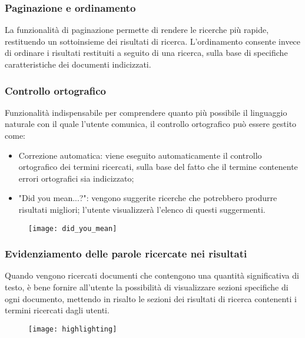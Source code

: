 			\subsubsection{Paginazione e ordinamento}
			La funzionalità di paginazione permette di rendere le ricerche più rapide, restituendo un sottoinsieme dei risultati di ricerca.
			L'ordinamento consente invece di ordinare i risultati restituiti a seguito di una ricerca, sulla base di specifiche caratteristiche dei documenti indicizzati.
			
			\subsubsection{Controllo ortografico}
			Funzionalità indispensabile per comprendere quanto più possibile il linguaggio naturale con il quale l'utente comunica, il controllo ortografico può essere gestito come:
			\begin{itemize}
				\item {Correzione automatica: viene eseguito automaticamente il controllo ortografico dei termini ricercati, sulla base del fatto che il termine contenente errori ortografici sia indicizzato;}
				\item {"Did you mean...?": vengono suggerite ricerche che potrebbero produrre risultati migliori; l'utente visualizzerà l'elenco di questi suggermenti.}
			\end{itemize}

			\begin{figure}[htbp]
				\begin{center}
					\texttt{[image: did\_you\_mean]}
				\end{center}
			\end{figure}

			\subsubsection{Evidenziamento delle parole ricercate nei risultati}
			Quando vengono ricercati documenti che contengono una quantità significativa di testo, è bene fornire all'utente la possibilità di visualizzare sezioni specifiche di ogni documento, mettendo in risalto le sezioni dei risultati di ricerca contenenti i termini ricercati dagli utenti.
			
			\begin{figure}[htbp]
				\begin{center}
					\texttt{[image: highlighting]}
				\end{center}
			\end{figure}
		

